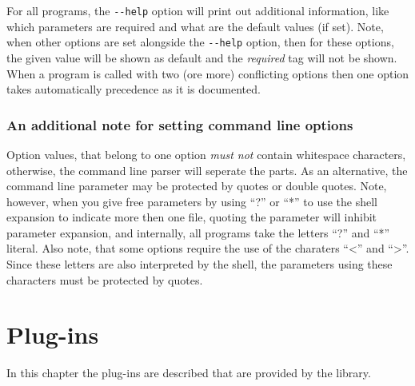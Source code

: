 \documentclass[english, 10pt, a4paper,headsepline,openany]{book}
\begin{document}
For all programs, the \texttt{-{}-help} option will print out additional information, like which parameters 
  are required and what are the default values (if set).
Note, when other options are set alongside the \texttt{-{}-help} option, then for these options, the given value 
  will be shown as default and the \emph{required} tag will not be shown.
When a program is called with two (ore more) conflicting options then one option takes automatically precedence 
  as it is documented. 

\subsection*{An additional note for setting command line options}

Option values, that belong to one option \emph{must not} contain whitespace characters, otherwise, 
  the command line parser will seperate the parts. 
As an alternative, the command line parameter may be protected by quotes or double quotes. 
Note, however, when you give free parameters by using ``?'' or ``*'' to use the shell expansion to indicate 
  more then one file, quoting the parameter will inhibit parameter expansion, and internally, all programs 
  take the letters ``?'' and ``*'' literal. 
Also note, that some options require the use of the charaters ``<'' and ``>''. 
Since these letters are also interpreted by the shell, the parameters using these characters must be 
  protected by quotes. 



\chapter{Plug-ins}
\label{ch:plugins}

In this chapter the plug-ins are described that are provided by the library.



\cleardoublepage{}

\end{document}
